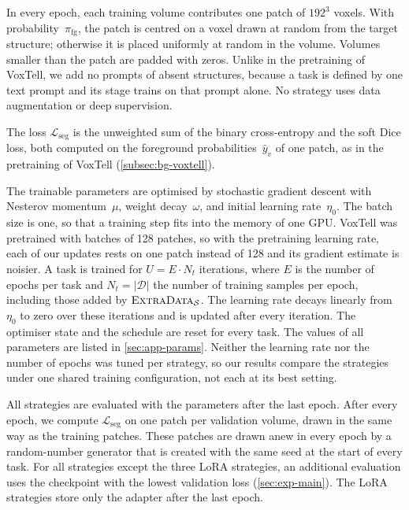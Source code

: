In every epoch, each training volume contributes one patch of $192^3$ voxels.
With probability~$\pi_{\mathrm{fg}}$, the patch is centred on a voxel drawn at random from the target structure; otherwise it is placed uniformly at random in the volume.
Volumes smaller than the patch are padded with zeros.
Unlike in the pretraining of VoxTell, we add no prompts of absent structures, because a task is defined by one text prompt and its stage trains on that prompt alone.
No strategy uses data augmentation or deep supervision.

The loss $\mathcal{L}_{\mathrm{seg}}$ is the unweighted sum of the binary cross-entropy and the soft Dice loss, both computed on the foreground probabilities~$\hat{y}_v$ of one patch, as in the pretraining of VoxTell (\cref{subsec:bg-voxtell}).

The trainable parameters are optimised by stochastic gradient descent with Nesterov momentum~$\mu$, weight decay~$\omega$, and initial learning rate~$\eta_0$.
The batch size is one, so that a training step fits into the memory of one GPU.
VoxTell was pretrained with batches of 128 patches, so with the pretraining learning rate, each of our updates rests on one patch instead of 128 and its gradient estimate is noisier.
A task is trained for $U = E \cdot N_t$ iterations, where $E$ is the number of epochs per task and $N_t = |\mathcal{D}|$ the number of training samples per epoch, including those added by $\textsc{ExtraData}_{\mathcal{S}}$.
The learning rate decays linearly from~$\eta_0$ to zero over these iterations and is updated after every iteration.
The optimiser state and the schedule are reset for every task.
The values of all parameters are listed in \cref{sec:app-params}.
Neither the learning rate nor the number of epochs was tuned per strategy, so our results compare the strategies under one shared training configuration, not each at its best setting.

All strategies are evaluated with the parameters after the last epoch.
After every epoch, we compute $\mathcal{L}_{\mathrm{seg}}$ on one patch per validation volume, drawn in the same way as the training patches.
These patches are drawn anew in every epoch by a random-number generator that is created with the same seed at the start of every task.
For all strategies except the three LoRA strategies, an additional evaluation uses the checkpoint with the lowest validation loss (\cref{sec:exp-main}).
The LoRA strategies store only the adapter after the last epoch.

